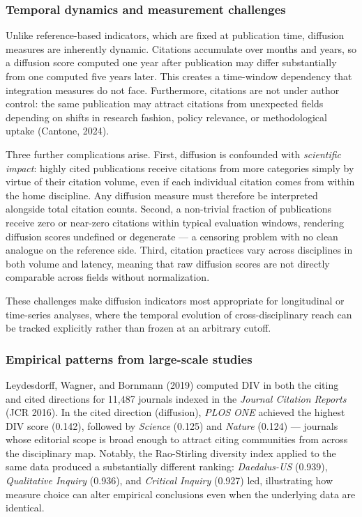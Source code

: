 \documentclass[
]{article}
\begin{document}
\hypertarget{temporal-dynamics-and-measurement-challenges}{%
\subsubsection{Temporal dynamics and measurement
challenges}\label{temporal-dynamics-and-measurement-challenges}}

Unlike reference-based indicators, which are fixed at publication time,
diffusion measures are inherently dynamic. Citations accumulate over
months and years, so a diffusion score computed one year after
publication may differ substantially from one computed five years later.
This creates a time-window dependency that integration measures do not
face. Furthermore, citations are not under author control: the same
publication may attract citations from unexpected fields depending on
shifts in research fashion, policy relevance, or methodological uptake
(Cantone, 2024).

Three further complications arise. First, diffusion is confounded with
\emph{scientific impact}: highly cited publications receive citations
from more categories simply by virtue of their citation volume, even if
each individual citation comes from within the home discipline. Any
diffusion measure must therefore be interpreted alongside total citation
counts. Second, a non-trivial fraction of publications receive zero or
near-zero citations within typical evaluation windows, rendering
diffusion scores undefined or degenerate --- a censoring problem with no
clean analogue on the reference side. Third, citation practices vary
across disciplines in both volume and latency, meaning that raw
diffusion scores are not directly comparable across fields without
normalization.

These challenges make diffusion indicators most appropriate for
longitudinal or time-series analyses, where the temporal evolution of
cross-disciplinary reach can be tracked explicitly rather than frozen at
an arbitrary cutoff.

\hypertarget{empirical-patterns-from-large-scale-studies}{%
\subsubsection{Empirical patterns from large-scale
studies}\label{empirical-patterns-from-large-scale-studies}}

Leydesdorff, Wagner, and Bornmann (2019) computed DIV in both the citing
and cited directions for 11,487 journals indexed in the \emph{Journal
Citation Reports} (JCR 2016). In the cited direction (diffusion),
\emph{PLOS ONE} achieved the highest DIV score (0.142), followed by
\emph{Science} (0.125) and \emph{Nature} (0.124) --- journals whose
editorial scope is broad enough to attract citing communities from
across the disciplinary map. Notably, the Rao-Stirling diversity index
applied to the same data produced a substantially different ranking:
\emph{Daedalus-US} (0.939), \emph{Qualitative Inquiry} (0.936), and
\emph{Critical Inquiry} (0.927) led, illustrating how measure choice can
alter empirical conclusions even when the underlying data are identical.
\end{document}
